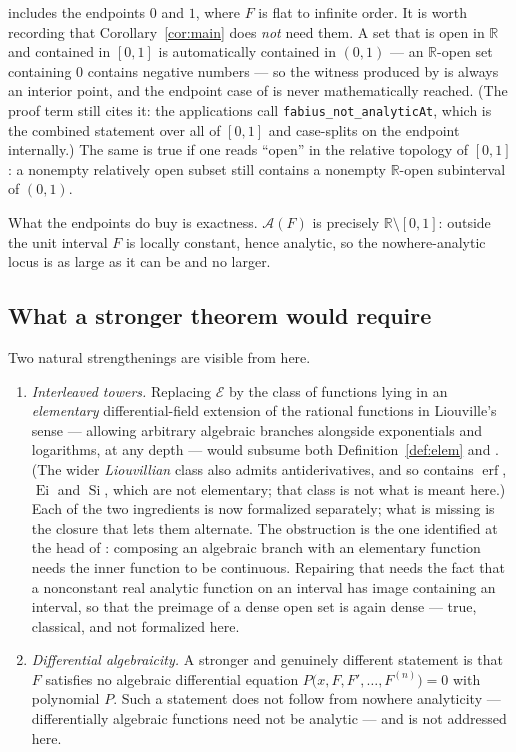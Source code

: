 \documentclass[11pt,oneside]{article}
\theoremstyle{definition}
\theoremstyle{remark}
\newcommand{\R}{\mathbb R}
\newcommand{\Elem}{\mathcal E}
\newcommand{\An}{\mathcal A}
\begin{document}
 includes the endpoints $0$ and $1$, where $F$ is flat to
infinite order.  It is worth recording that Corollary~\ref{cor:main} does \emph{not}
need them.  A set that is open in $\R$ and contained in $[0,1]$ is
automatically contained in $(0,1)$ --- an $\R$-open set containing $0$
contains negative numbers --- so the witness produced by
 is always an interior point, and the endpoint case of
 is never mathematically reached.  (The proof term still
cites it: the applications call \texttt{fabius\_not\_analyticAt}, which is the
combined statement over all of $[0,1]$ and case-splits on the endpoint
internally.)  The same is true if one reads ``open''
in the relative topology of $[0,1]$: a nonempty relatively open subset still
contains a nonempty $\R$-open subinterval of $(0,1)$.

What the endpoints do buy is exactness.  $\An(F)$ is precisely
$\R\setminus[0,1]$: outside the unit interval $F$ is locally constant, hence
analytic, so the nowhere-analytic locus is as large as it can be and no
larger.

\subsection{What a stronger theorem would require}

Two natural strengthenings are visible from here.

\begin{enumerate}
\item \emph{Interleaved towers.}  Replacing $\Elem$ by the class of functions
      lying in an \emph{elementary} differential-field extension of the
      rational functions in Liouville's sense --- allowing arbitrary algebraic
      branches alongside exponentials and logarithms, at any depth --- would
      subsume both Definition~\ref{def:elem} and .
      (The wider \emph{Liouvillian} class also
      admits antiderivatives, and so contains $\operatorname{erf}$,
      $\operatorname{Ei}$ and $\operatorname{Si}$, which are not elementary;
      that class is not what is meant here.)  Each of the two ingredients is
      now formalized separately; what is missing is the closure that lets them
      alternate.  The obstruction is the one identified at the head of
      : composing an algebraic branch with an elementary
      function needs the inner function to be continuous.  Repairing that
      needs the fact that a nonconstant real analytic function on an interval
      has image containing an interval, so that the preimage of a dense open
      set is again dense --- true, classical, and not formalized here.
\item \emph{Differential algebraicity.}  A stronger and genuinely different
      statement is that $F$ satisfies no algebraic differential equation
      $P\bigl(x,F,F',\ldots,F^{(n)}\bigr)=0$ with polynomial $P$.  Such a
      statement does not follow from nowhere analyticity --- differentially
      algebraic functions need not be analytic --- and is not addressed here.
\end{enumerate}
\end{document}
